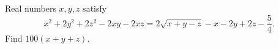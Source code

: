 Real numbers $x,y,z$ satisfy
\[
x^2+2y^2+2z^2-2xy-2xz
=2\sqrt{x+y-z}-x-2y+2z-\dfrac{5}{4}.
\]
Find $100(x+y+z)$.
